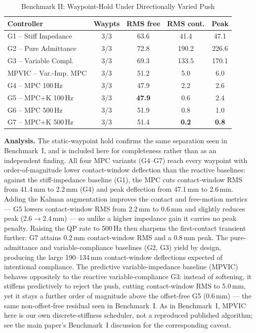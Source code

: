 \documentclass[journal]{IEEEtran}
\begin{document}
\begin{table}[!t]
\caption{Benchmark II: Waypoint-Hold Under Directionally Varied Push}
\label{tab:bm2}
\renewcommand{\arraystretch}{1.0}
\footnotesize
\setlength{\tabcolsep}{3pt}
\begin{tabular}{lcccc}
\toprule
\textbf{Controller} & \textbf{Waypts} & \textbf{RMS free} & \textbf{RMS cont.} & \textbf{Peak}\\
\midrule
G1 -- Stiff Impedance    & 3/3 & 63.6 & 41.4 & 47.1\\
G2 -- Pure Admittance    & 3/3 & 72.8 & 190.2 & 226.6\\
G3 -- Variable Compl.    & 3/3 & 69.3 & 133.5 & 170.1\\
MPVIC -- Var.-Imp. MPC   & 3/3 & 51.2 & 5.0 & 6.0\\
G4 -- MPC 100\,Hz        & 3/3 & 47.9 & 2.2 & 2.6\\
G5 -- MPC+K 100\,Hz      & 3/3 & \textbf{47.9} & 0.6 & 2.4\\
G6 -- MPC 500\,Hz        & 3/3 & 51.9 & 0.8 & 1.0\\
G7 -- MPC+K 500\,Hz      & 3/3 & 51.4 & \textbf{0.2} & \textbf{0.8}\\
\bottomrule
\end{tabular}
\end{table}

\textbf{Analysis.} The static-waypoint hold confirms the same separation
seen in Benchmark~I, and is included here for completeness rather than
as an independent finding. All four MPC variants (G4--G7) reach every
waypoint with order-of-magnitude lower contact-window deflection than
the reactive baselines: against the stiff-impedance baseline (G1), the
MPC cuts contact-window RMS from 41.4\,mm to 2.2\,mm (G4) and peak
deflection from 47.1\,mm to 2.6\,mm. Adding the Kalman augmentation
improves the contact and free-motion metrics --- G5 lowers contact-window
RMS from 2.2\,mm to 0.6\,mm and slightly reduces peak (2.6$\to$2.4\,mm)
--- so unlike a higher impedance gain it carries no peak penalty. Raising
the QP rate to 500\,Hz then sharpens the first-contact transient
further: G7 attains 0.2\,mm contact-window RMS and a 0.8\,mm peak. The
pure-admittance and variable-compliance baselines (G2, G3) yield by
design, producing the large 190--134\,mm contact-window deflections
expected of intentional compliance. The predictive variable-impedance
baseline (MPVIC) behaves oppositely to the reactive variable-compliance
G3: instead of softening, it stiffens predictively to reject the push,
cutting contact-window RMS to 5.0\,mm, yet it stays a further order of
magnitude above the offset-free G5 (0.6\,mm) --- the same non-offset-free
residual seen in Benchmark~I. As in Benchmark~I, MPVIC here is our own
discrete-stiffness scheduler, not a reproduced published algorithm; see
the main paper's Benchmark~I discussion for the corresponding caveat.
\end{document}
